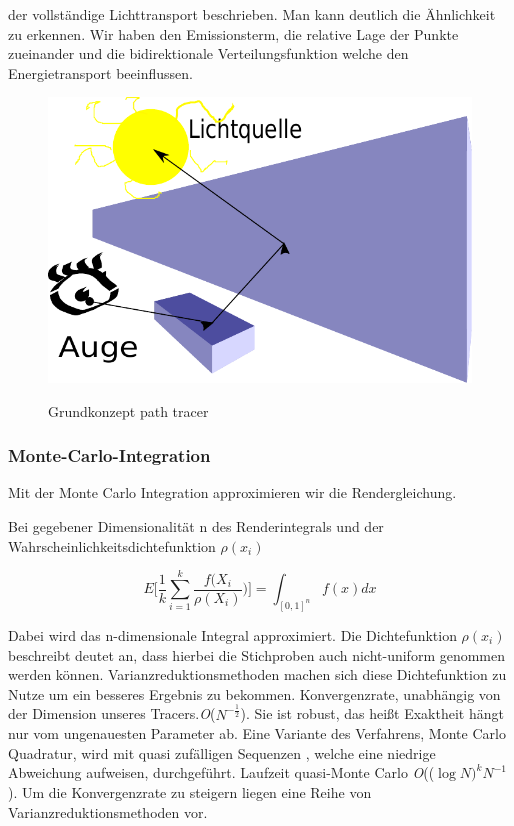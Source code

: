 der vollständige Lichttransport beschrieben. Man kann deutlich die Ähnlichkeit
zu  erkennen. Wir haben den Emissionsterm, die relative Lage der 
Punkte zueinander und die bidirektionale Verteilungsfunktion welche den Energietransport
beeinflussen.

\begin{figure}[H]
    \centering
    \includegraphics[width=0.7\linewidth]{content/PathTracer/Bilder/Grundkonzept_path_tracing.pdf}
    \label{pic::Grundkonzept Path Tracing}
    \caption{Grundkonzept path tracer}
\end{figure}

\subsubsection{Monte-Carlo-Integration}
Mit der Monte Carlo Integration approximieren wir die Rendergleichung.\par 
Bei gegebener Dimensionalität n des Renderintegrals und der 
Wahrscheinlichkeitsdichtefunktion $\rho(x_i)$
\cite{KK02}

\begin{equation}\label{eq:Monte-Carlo}
    E\biggl[\frac{1}{k}\sum_{i=1}^{k}\frac{f(X_{i}}{\rho(X_{i})})\biggl] = \int_{[0,1]^{n}}f(x)dx
\end{equation}

Dabei wird das n-dimensionale Integral approximiert. Die Dichtefunktion $\rho(x_i)$ 
beschreibt deutet an, dass hierbei die Stichproben auch nicht-uniform 
genommen werden können. Varianzreduktionsmethoden machen sich diese Dichtefunktion zu Nutze um 
ein besseres Ergebnis zu bekommen.
\cite{caflisch_1998}
Konvergenzrate, unabhängig von der Dimension unseres Tracers.\textit{O}($N^{-\frac{1}{2}}$).
Sie ist robust, das heißt Exaktheit hängt nur vom ungenauesten Parameter ab. Eine Variante des Verfahrens, 
Monte Carlo Quadratur, wird mit quasi zufälligen Sequenzen , 
welche eine niedrige Abweichung aufweisen, durchgeführt. Laufzeit quasi-Monte Carlo \textit{O}(($\log N)^{k}N^{-1}$).
Um die Konvergenzrate zu steigern liegen eine Reihe von Varianzreduktionsmethoden vor.

